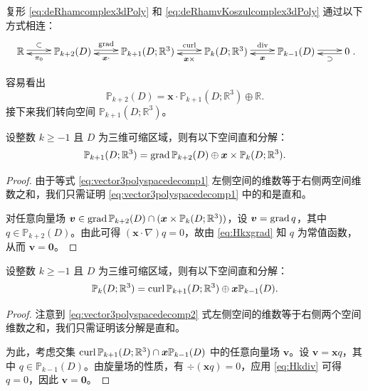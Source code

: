 复形 \eqref{eq:deRhamcomplex3dPoly} 和 \eqref{eq:deRhamvKoszulcomplex3dPoly} 通过以下方式相连：
\begin{equation}\label{eq:divdivcomplex3dPolydouble}
\xymatrix{
\mathbb R\ar@<0.4ex>[r]^-{\subset} & \mathbb P_{k+2}(D)\ar@<0.4ex>[r]^-{\grad}\ar@<0.4ex>[l]^-{\pi_{0}} & \mathbb P_{k+1}(D; \mathbb R^3)\ar@<0.4ex>[r]^-{\curl}\ar@<0.4ex>[l]^-{\boldsymbol x\cdot}  & \mathbb P_k(D; \mathbb R^3) \ar@<0.4ex>[r]^-{\div}\ar@<0.4ex>[l]^-{\boldsymbol x\times} & \mathbb P_{k-1}(D)  \ar@<0.4ex>[r]^-{} \ar@<0.4ex>[l]^-{\boldsymbol x}
& 0 \ar@<0.4ex>[l]^-{\supset} }.
\end{equation}

容易看出
\[
\mathbb P_{k+2}(D)= \boldsymbol x\cdot\mathbb P_{k+1}(D; \mathbb R^3)\oplus\mathbb R.
\]
接下来我们转向空间 $\mathbb P_{k+1}(D; \mathbb R^3)$。
\begin{lemma}
设整数 $k \geq -1$ 且 $D$ 为三维可缩区域，则有以下空间直和分解：
\begin{equation}\label{eq:vector3polyspacedecomp1}
\mathbb P_{k+1}(D; \mathbb R^3)=\operatorname{grad}\mathbb P_{k+2}(D)\oplus\boldsymbol x\times\mathbb P_k(D; \mathbb R^3).
\end{equation}
\end{lemma}
\begin{proof}
由于等式 \eqref{eq:vector3polyspacedecomp1} 左侧空间的维数等于右侧两空间维数之和，我们只需证明 \eqref{eq:vector3polyspacedecomp1} 中的和是直和。

对任意向量场 $\boldsymbol v \in \operatorname{grad}\mathbb P_{k+2}(D) \cap (\boldsymbol x\times\mathbb P_k(D; \mathbb R^3))$，设 $\boldsymbol v = \operatorname{grad} q$，其中 $q \in \mathbb P_{k+2}(D)$。由此可得 $(\boldsymbol x\cdot\nabla)q = 0$，故由 \eqref{eq:Hkxgrad} 知 $q$ 为常值函数，从而 $\boldsymbol v = \boldsymbol 0$。
\end{proof}

\begin{lemma}
设整数 $k \geq -1$ 且 $D$ 为三维可缩区域，则有以下空间直和分解：
\begin{equation}\label{eq:vector3polyspacedecomp2}
\mathbb P_{k}(D; \mathbb R^3)=\operatorname{curl}\mathbb P_{k+1}(D;\mathbb R^3)\oplus \boldsymbol x\mathbb P_{k-1}(D).
\end{equation}
\end{lemma}
\begin{proof}
注意到 \eqref{eq:vector3polyspacedecomp2} 式左侧空间的维数等于右侧两个空间维数之和，我们只需证明该分解是直和。

为此，考虑交集 $\operatorname{curl}\mathbb P_{k+1}(D;\mathbb R^3) \cap \boldsymbol x\mathbb P_{k-1}(D)$ 中的任意向量场 $\boldsymbol v$。设 $\boldsymbol v = \boldsymbol x q$，其中 $q \in \mathbb P_{k-1}(D)$。由旋量场的性质，有 $\div(\boldsymbol x q) = 0$，应用 \eqref{eq:Hkdiv} 可得 $q = 0$，因此 $\boldsymbol v = \boldsymbol 0$。
\end{proof}



